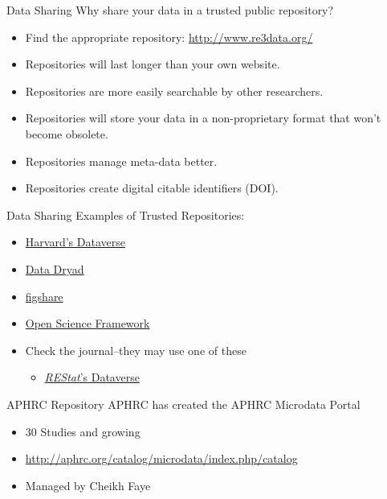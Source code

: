 \documentclass{beamer}
\begin{document}

\begin{frame}{Data Sharing}
Why share your data in a trusted public repository?
\begin{itemize}[<.->]
\item
Find the appropriate repository: \url{http://www.re3data.org/}
\item
Repositories will last longer than your own website.
\item
Repositories are more easily searchable by other researchers.
\item
Repositories will store your data in a non-proprietary format that won't become obsolete.
\item 
Repositories manage meta-data better.
\item
Repositories create digital citable identifiers (DOI).

\end{itemize}
\end{frame}

\begin{frame}{Data Sharing}
Examples of Trusted Repositories:
\begin{itemize}
\item \href{http://dataverse.harvard.edu}{Harvard's Dataverse}
\item \href{http://datadryad.org/}{Data Dryad}
\item \href{http://figshare.com}{figshare}
\item \href{http://osf.io}{Open Science Framework}
\item Check the journal--they may use one of these
\begin{itemize}
\item \href{https://dataverse.harvard.edu/dataverse/restat}{\textit{REStat}'s Dataverse}
\end{itemize}
\end{itemize}
\end{frame}

\begin{frame}{APHRC Repository}
APHRC has created the APHRC Microdata Portal
\begin{itemize}
\item 30 Studies and growing
\item \url{http://aphrc.org/catalog/microdata/index.php/catalog}
\item Managed by Cheikh Faye
\end{itemize}
\end{frame}
\end{document}
